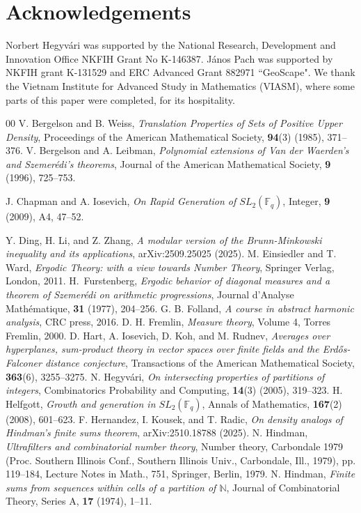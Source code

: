 \documentclass[11pt]{article}
\theoremstyle{definition}
\begin{document}
\section{Acknowledgements}
Norbert Hegyv\'{a}ri was supported by the National Research, Development and Innovation Office NKFIH Grant No K-146387. J\'{a}nos Pach was supported by NKFIH grant K-131529 and ERC Advanced Grant 882971 ``GeoScape". We thank the Vietnam Institute for Advanced Study in Mathematics (VIASM), where some parts of this paper were completed, for its hospitality.
\begin{thebibliography}{00}
 V. Bergelson and B. Weiss, \textit{Translation Properties of Sets of Positive Upper Density}, Proceedings of the American Mathematical Society, \textbf{94}(3) (1985), 371--376.
V. Bergelson and A. Leibman, \textit{Polynomial extensions of Van der Waerden's and Szemer\'{e}di's theorems}, Journal of the American Mathematical Society, \textbf{9} (1996), 725--753.

J. Chapman and A. Iosevich, \textit{On Rapid Generation of $SL_2(\mathbb{F}_q)$}, Integer, \textbf{9} (2009), A4, 47--52.

Y. Ding, H. Li, and Z. Zhang, \textit{A modular version of the Brunn-Minkowski inequality and its applications}, arXiv:2509.25025 (2025).
M. Einsiedler and T. Ward, \textit{Ergodic Theory: with a view towards Number Theory}, Springer Verlag, London, 2011.
H.~Furstenberg,
\emph{Ergodic behavior of diagonal measures and a theorem of Szemer\'edi on arithmetic progressions},
Journal d'Analyse Math\'ematique, \textbf{31} (1977), 204--256.
G. B. Folland, \textit{A course in abstract harmonic analysis}, CRC press, 2016.
D. H. Fremlin, \textit{Measure theory}, Volume 4, Torres Fremlin, 2000.
D. Hart, A. Iosevich, D. Koh, and M. Rudnev, \textit{Averages over hyperplanes, sum-product theory in vector spaces over finite fields and the Erd\H{o}s-Falconer distance conjecture},  Transactions of the American Mathematical Society, \textbf{363}(6), 3255--3275.
 N. Hegyv\'ari, 
\textit{On intersecting properties of partitions of integers},
Combinatorics Probability and Computing, \textbf{14}(3) (2005), 319--323.
H. Helfgott, \textit{Growth and generation in $SL_2(\mathbb{F}_q)$}, Annals of Mathematics, \textbf{167}(2) (2008), 601--623.
F. Hernandez, I. Kousek, and T. Radic, \textit{On density analogs of Hindman’s finite sums theorem}, arXiv:2510.18788 (2025).
  N. Hindman, \textit{Ultrafilters and combinatorial number theory},
Number theory, Carbondale 1979 (Proc. Southern Illinois Conf.,
Southern Illinois Univ., Carbondale, Ill., 1979),  pp. 119--184,
Lecture Notes in Math., 751, Springer, Berlin, 1979.
N. Hindman, \textit{Finite sums from sequences within cells of a partition of $\mathbb{N}$}, Journal of Combinatorial Theory, Series A, \textbf{17} (1974), 1--11.



\end{thebibliography}
\end{document}
